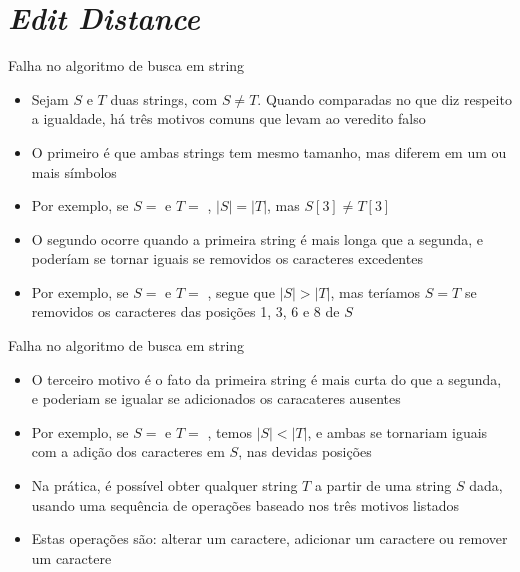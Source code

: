 \section{\it Edit Distance}

\begin{frame}[fragile]{Falha no algoritmo de busca em string}

    \begin{itemize}
        \item  Sejam $S$ e $T$ duas strings, com $S \neq T$. Quando comparadas no que diz respeito
            a igualdade, há três motivos comuns que levam ao veredito falso 
        \pause

        \item O primeiro é que ambas strings tem mesmo tamanho, mas diferem em um ou mais símbolos
        \pause

        \item Por exemplo, se $S = $  e $T = $ , 
            $|S| = |T|$, mas $S[3] \neq T[3]$
        \pause

        \item O segundo ocorre quando a primeira string é mais longa que a segunda, e poderíam se 
            tornar iguais se removidos os caracteres excedentes
        \pause

        \item Por exemplo, se $S = $  e $T = $ , segue que
            $|S| > |T|$, mas teríamos $S = T$ se removidos os caracteres das posições 
            1, 3, 6 e 8 de $S$
    \end{itemize}

\end{frame}

\begin{frame}[fragile]{Falha no algoritmo de busca em string}

    \begin{itemize}
        \item O terceiro motivo é o fato da primeira string é mais curta do que a segunda, e 
            poderiam se igualar se adicionados os caracateres ausentes
        \pause

        \item Por exemplo, se $S = $  e $T = $ , temos
            $|S| < |T|$, e ambas se tornariam iguais com a adição dos caracteres 
                 em $S$, nas devidas posições
        \pause

        \item Na prática, é possível obter qualquer string $T$ a partir de uma string $S$ dada, 
            usando uma sequência de operações baseado nos três motivos listados
        \pause

        \item Estas operações são: alterar um caractere, adicionar um caractere ou remover um caractere
    \end{itemize}

\end{frame}

